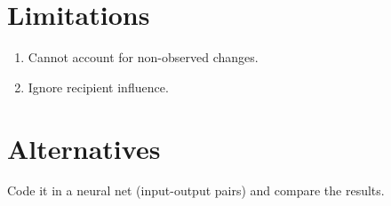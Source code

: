 \documentclass{article}
\begin{document}
\section{Limitations}

\begin{enumerate}
	\item Cannot account for non-observed changes.
	\item Ignore recipient influence.
\end{enumerate}

\section{Alternatives}

Code it in a neural net (input-output pairs) and compare the results.
\end{document}
